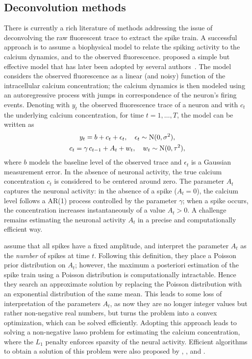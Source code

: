 \subsection{Deconvolution methods}

There is currently a rich literature of methods addressing the issue of deconvolving the raw fluorescent trace to extract the spike train. A successful approach is to assume a biophysical model to relate the spiking activity to the calcium dynamics, and to the observed fluorescence. \citet{vogelstein2010} proposed a simple but effective model that has later been adopted by several authors~\citep{pnevmatikakis2016, friedrich2016, friedrich2017, jewell2018, jewell2019}. The model considers the observed fluorescence as a linear (and noisy) function of the intracellular calcium concentration; the calcium dynamics is then modeled using an autoregressive process with jumps in correspondence of the neuron's firing events.
Denoting with $y_t$ the observed fluorescence trace of a neuron and with $c_t$ the underlying calcium concentration, for time $t=1,\dots,T$, the model can be written as
\begin{equation}
\begin{gathered}
y_t = b + c_t + \epsilon_t,\quad \epsilon_t \sim \N(0,\sigma^2),  \\
c_t = \gamma\, c_{t-1} + A_t + w_t, \quad w_t \sim \N(0, \tau^2),
\end{gathered}
\label{eq:ch1_armodel}
\end{equation}
where $b$ models the baseline level of the observed trace and $\epsilon_t$ is a Gaussian measurement error. In the absence of neuronal activity, the true calcium concentration $c_t$ is considered to be centered around zero. The parameter $A_t$ captures the neuronal activity: in the absence of a spike ($A_t = 0$), the calcium level follows a AR(1) process controlled by the parameter $\gamma$; when a spike occurs, the concentration increases instantaneously of a value $A_t > 0$.
A challenge remains estimating the neuronal activity $A_t$ in a precise and computationally efficient way.

\citet{vogelstein2010} assume that all spikes have a fixed amplitude, and interpret the parameter $A_t$ as the \textit{number} of spikes at time $t$. Following this definition, they place a Poisson prior distribution on $A_t$; however, the maximum a posteriori estimation of the spike train using a Poisson distribution is computationally intractable. Hence they search an approximate solution by replacing the Poisson distribution with an exponential distribution of the same mean. This leads to some loss of interpretation of the parameters $A_t$, as now they are no longer integer values but rather non-negative real numbers, but turns the problem into a convex optimization, which can be solved efficiently.
Adopting this approach leads to solving a non-negative lasso problem for estimating the calcium concentration, where the $L_1$ penalty enforces sparsity of the neural activity.
Efficient algorithms to obtain a solution of this problem were also proposed by \citet{pnevmatikakis2016}, \citet{friedrich2016}, and \citet{friedrich2017}.

